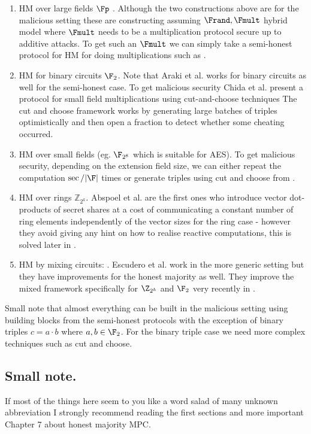 \begin{enumerate}
  \item HM over large fields $\Fp$ \cite{CCS:LinNof17,C:CGHIKL18}. Although the
  two constructions above are for the malicious setting these are constructing
  assuming $\Frand, \Fmult$ hybrid model where $\Fmult$ needs to be a multiplication
  protocol secure up to additive attacks. To get such an $\Fmult$ we can simply take
  a semi-honest protocol for HM for doing multiplications such as \cite{CCS:AFLNO16}.
  \item HM for binary circuits $\F_2$. Note that Araki et al. \cite{CCS:AFLNO16}
  works for binary circuits as well for the semi-honest case.
  To get malicious security Chida et al. \cite{C:CGHIKL18} present a protocol
  for small field multiplications using cut-and-choose techniques The cut and
  choose framework works by generating large batches of triples
  optimistically and then open a fraction to detect whether some cheating
  occurred.
  \item HM over small fields (eg. $\F_{2^8}$ which is suitable for AES). To
  get malicious security, depending on the extension field size, we can
  either repeat the computation $\sec/|\F|$ times or generate triples using cut and choose
  from \cite{C:CGHIKL18}.
  \item HM over rings $\mathbb{Z}_{2^k}$. Abspoel et al. \cite{EPRINT:ADEN19}
  are the first ones who introduce vector dot-products of secret shares at a cost of
  communicating a constant number of ring elements independently of the vector sizes
  for the ring case - however they avoid giving any hint on how to realise
  reactive computations, this is solved later in \cite{cryptoeprint:2020:1330}.
  \item HM by mixing circuits: \cite{CCS:MohRin18,cryptoeprint:2020:1330}.
  Escudero et al. \cite{C:EGKRS20} work in the more generic setting but they
  have
  improvements for the honest majority as well. They improve the mixed framework
  specifically for $\Z_{2^k}$ and $\F_2$ very recently in \cite{cryptoeprint:2020:1330}.

\end{enumerate}

Small note that almost everything can be built in the malicious setting using
building blocks from the semi-honest protocols with the exception of binary triples
$c = a \cdot b$ where $a,b \in \F_2$. For the binary triple case we need more
complex techniques such as cut and choose.


\subsection{Small note.}
If most of the things here seem to you like a word salad of many unknown
abbreviation I strongly recommend reading the first sections
\cite{evans2017pragmatic} and more important Chapter 7 about honest majority MPC.

